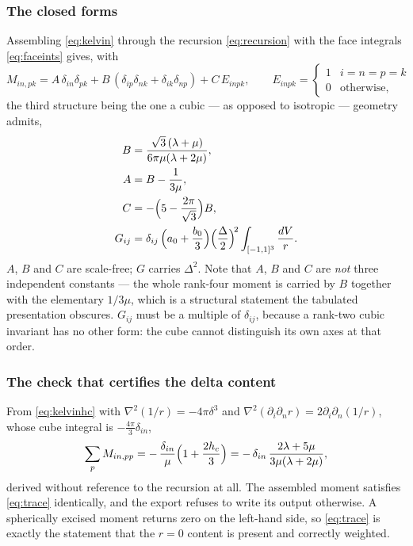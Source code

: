 \documentclass[11pt,a4paper]{article}
\begin{document}
\subsubsection{The closed forms}

Assembling \eqref{eq:kelvin} through the recursion \eqref{eq:recursion} with the
face integrals \eqref{eq:faceints} gives, with
\begin{equation}\label{eq:Mdecomp}
  M_{in,pk} = A\,\delta_{in}\delta_{pk}
            + B\,(\delta_{ip}\delta_{nk} + \delta_{ik}\delta_{np})
            + C\,E_{inpk},
  \qquad
  E_{inpk} = \begin{cases}1 & i=n=p=k\\ 0 & \text{otherwise,}\end{cases}
\end{equation}
the third structure being the one a cubic --- as opposed to isotropic ---
geometry admits,
\begin{align}
  B &= \frac{\sqrt3\,(\lambda+\mu)}{6\pi\mu(\lambda+2\mu)}, \label{eq:Bclosed}\\
  A &= B - \frac{1}{3\mu}, \label{eq:Aclosed}\\
  C &= -\Bigl(5 - \frac{2\pi}{\sqrt3}\Bigr)B, \label{eq:Cclosed}\\
  G_{ij} &= \delta_{ij}\,\Bigl(a_0 + \frac{b_0}{3}\Bigr)\Bigl(\frac{\Delta}{2}\Bigr)^{\!2}
            \int_{[-1,1]^3}\frac{dV}{r}. \label{eq:Gclosed}
\end{align}
$A$, $B$ and $C$ are scale-free; $G$ carries $\Delta^2$.  Note that $A$, $B$ and
$C$ are \emph{not} three independent constants --- the whole rank-four moment is
carried by $B$ together with the elementary $1/3\mu$, which is a structural
statement the tabulated presentation obscures.  $G_{ij}$ must be a multiple of
$\delta_{ij}$, because a rank-two cubic invariant has no other form: the cube
cannot distinguish its own axes at that order.

\subsubsection{The check that certifies the delta content}

From \eqref{eq:kelvinhc} with $\nabla^2(1/r) = -4\pi\delta^3$ and
$\nabla^2(\partial_i\partial_n r) = 2\partial_i\partial_n(1/r)$, whose cube
integral is $-\tfrac{4\pi}{3}\delta_{in}$,
\begin{equation}\label{eq:trace}
  \sum_p M_{in,pp}
  = -\,\frac{\delta_{in}}{\mu}\Bigl(1 + \frac{2h_c}{3}\Bigr)
  = -\,\delta_{in}\,\frac{2\lambda+5\mu}{3\mu(\lambda+2\mu)} ,
\end{equation}
derived without reference to the recursion at all.  The assembled moment
satisfies \eqref{eq:trace} identically, and the export refuses to write its
output otherwise.  A spherically excised moment returns zero on the left-hand
side, so \eqref{eq:trace} is exactly the statement that the $r=0$ content is
present and correctly weighted.
\end{document}
